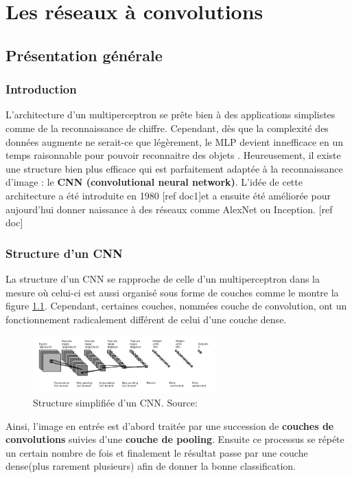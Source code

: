 

\chapter{Les réseaux à convolutions}


\section{Présentation générale}

\subsection{Introduction}
L'architecture d'un multiperceptron se prête bien à des applications simplistes comme de la reconnaissance de chiffre. Cependant, dès que la complexité des données augmente ne serait-ce que légèrement, le MLP devient innefficace en un temps raisonnable pour pouvoir reconnaitre des objets . Heureusement, il existe une structure bien plus efficace qui est parfaitement adaptée à la reconnaissance d'image : le \textbf{CNN (convolutional neural network)}. L'idée de cette architecture a été introduite en 1980 [ref doc1]et a ensuite été améliorée pour aujourd'hui donner naissance à des réseaux comme AlexNet ou Inception. [ref doc]

\subsection{Structure d'un CNN}
La structure d'un CNN se rapproche de celle d'un multiperceptron dans la mesure où celui-ci est aussi organisé sous forme de couches comme le montre la figure \ref{structure_1}. Cependant, certaines couches, nommées couche de convolution, ont un fonctionnement radicalement différent de celui d'une couche dense. \\

\begin{figure}[!h]
\centering
\includegraphics[width=200pt]{images/cnn/structure_CNN.png} 
\caption{Structure simplifiée d'un CNN. Source:\cite{backpropagation_cnn} }
\label{structure_1}
\end{figure}

Ainsi, l'image en entrée est d'abord traitée par une succession de \textbf{couches de convolutions} suivies d'une \textbf{couche de pooling}. Ensuite ce processus se répéte un certain nombre de fois et finalement le résultat passe par une couche dense(plus rarement plusieurs) afin de donner la bonne classification.

